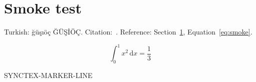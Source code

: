 \documentclass[a4paper]{article}
\begin{document}
\section{Smoke test}
\label{sec:smoke}

Turkish: \foreignlanguage{turkish}{ğüşıöç ĞÜŞİÖÇ}.
Citation:~\cite{knuth1984texbook}. Reference: Section~\ref{sec:smoke},
Equation~\eqref{eq:smoke}.

\begin{equation}
  \int_0^1 x^2 \, \mathrm{d}x = \frac{1}{3}
  \label{eq:smoke}
\end{equation}

SYNCTEX-MARKER-LINE

\printbibliography
\end{document}
